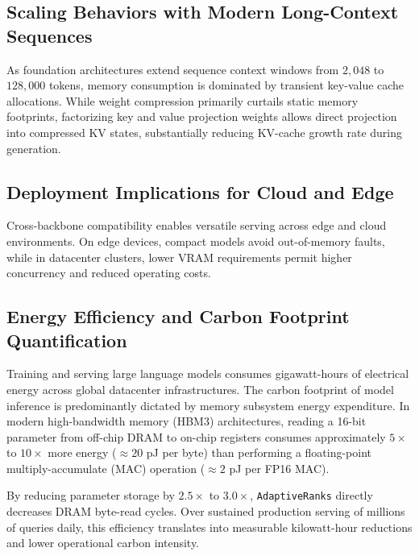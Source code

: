 \subsection{Scaling Behaviors with Modern Long-Context Sequences}
As foundation architectures extend sequence context windows from $2{,}048$ to $128{,}000$ tokens, memory consumption is dominated by transient key-value cache allocations. While weight compression primarily curtails static memory footprints, factorizing key and value projection weights allows direct projection into compressed KV states, substantially reducing KV-cache growth rate during generation.

\subsection{Deployment Implications for Cloud and Edge}
Cross-backbone compatibility enables versatile serving across edge and cloud environments. On edge devices, compact models avoid out-of-memory faults, while in datacenter clusters, lower VRAM requirements permit higher concurrency and reduced operating costs.

\subsection{Energy Efficiency and Carbon Footprint Quantification}
Training and serving large language models consumes gigawatt-hours of electrical energy across global datacenter infrastructures. The carbon footprint of model inference is predominantly dictated by memory subsystem energy expenditure. In modern high-bandwidth memory (HBM3) architectures, reading a 16-bit parameter from off-chip DRAM to on-chip registers consumes approximately $5\times$ to $10\times$ more energy ($\approx 20$ pJ per byte) than performing a floating-point multiply-accumulate (MAC) operation ($\approx 2$ pJ per FP16 MAC).

By reducing parameter storage by $2.5\times$ to $3.0\times$, \texttt{AdaptiveRanks} directly decreases DRAM byte-read cycles. Over sustained production serving of millions of queries daily, this efficiency translates into measurable kilowatt-hour reductions and lower operational carbon intensity.
